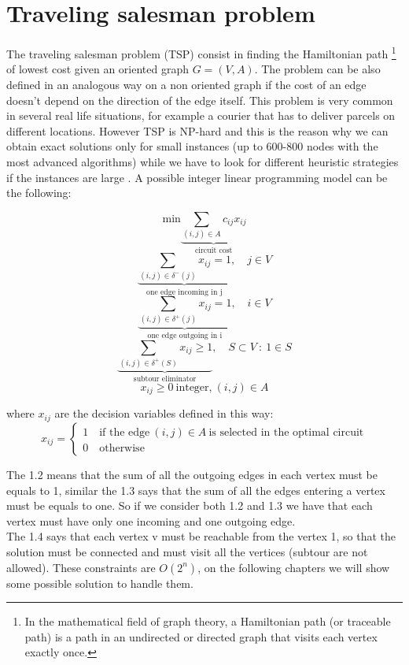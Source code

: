 \section{Traveling salesman problem}
The traveling salesman problem (TSP) consist in finding the Hamiltonian path \footnote{In the mathematical field of graph theory, a Hamiltonian path (or traceable path) is a path in an undirected or directed graph that visits each vertex exactly once.} of lowest cost given an oriented graph $G=(V, A)$. The problem can be also defined in an analogous way on a non oriented graph if the cost of an edge doesn't depend  on the direction of the edge itself. This problem is very common in several real life situations, for example a courier that has to deliver parcels on different locations. However TSP is NP-hard and this is the reason why we can obtain exact solutions only for small instances (up to 600-800 nodes with the most advanced algorithms) while we have to look for different heuristic strategies if the instances are large \cite{ro}.
A possible integer linear programming model can be the following:

\begin{equation}
	\text{min} \underbrace{\sum_{(i,j) \in A} c_{ij}x_{ij}}_\text{circuit cost}
\end{equation}
\begin{equation}
	\underbrace{\sum_{(i,j) \in \delta^{-}(j)} x_{ij} = 1}_\text{one edge incoming in j}, \quad j \in V 
\end{equation}
\begin{equation}
	\underbrace{\sum_{(i,j) \in \delta^{+}(j)} x_{ij} = 1}_\text{one edge outgoing in i}, \quad i \in V
\end{equation}
\begin{equation}
	\underbrace{\sum_{(i,j) \in \delta^{+}(S)} x_{ij} \geq 1}_\text{subtour eliminator}, \quad S \subset V \ : \ 1 \in S
\end{equation}
\begin{equation}
	x_{ij} \geq 0 \ \text{integer,} \ (i,j) \in A 
\end{equation}

where $x_{ij}$ are the decision variables defined in this way:
\[ x_{ij} =
	\begin{cases}
		1 \quad \text{if the edge} \ (i,j) \in A \ \text{is selected in the optimal circuit} \\
		0 \quad \text{otherwise}
	\end{cases}
\]

\noindent The 1.2 means that the sum of all the outgoing edges in each vertex must be equals to 1, similar the 1.3 says that the sum of all the edges entering a vertex must be equals to one. So if we consider both 1.2 and 1.3 we have that each vertex must have only one incoming and one outgoing edge. \\ The 1.4 says that each vertex v must be reachable from the vertex 1, so that the solution must be connected and must visit all the vertices (subtour are not allowed). These constraints are $O(2^n)$, on the following chapters we will show some possible solution to handle them.


